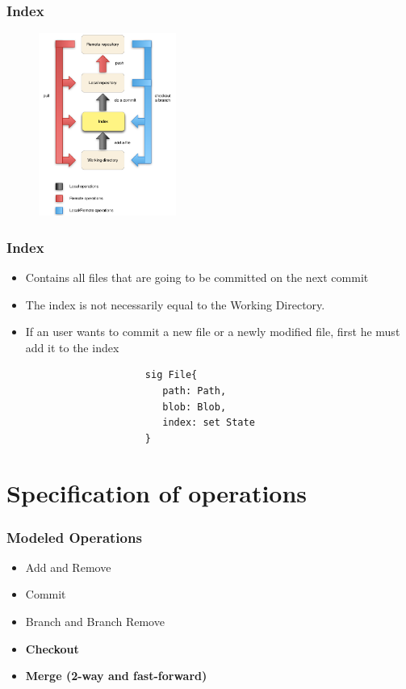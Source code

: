 \documentclass{beamer}
\begin{document}
\begin{frame}
   \frametitle{Index}
   \begin{figure}
      \centering
      \includegraphics[width=0.4\textwidth]{images/workflow1.png}
   \end{figure}
\end{frame}

\begin{frame}[fragile]
   \frametitle{Index}
   \begin{itemize}
      \item Contains all files that are going to be committed on the next
      commit 
      \item The index is not necessarily equal to the Working Directory.
      \item If an user wants to commit a new file or a newly modified file,
      first he must add it to the index
   \end{itemize}
   \vspace{10mm}
   \tiny
   \color{blue}
   \begin{lstlisting}
                        sig File{
                           path: Path,
                           blob: Blob,
                           index: set State
                        }

   \end{lstlisting}

\end{frame}


\section{Specification of operations}

\begin{frame}[fragile]
   \frametitle{Modeled Operations}
   \begin{itemize}
      \item Add and Remove
      \item Commit
      \item Branch and Branch Remove
      \item {\bf Checkout}
      \item {\bf Merge (2-way and fast-forward) }
   \end{itemize}
\end{frame}
\end{document}
